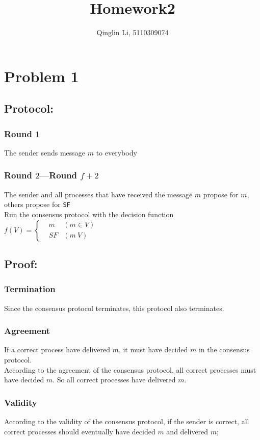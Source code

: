\documentclass[12pt]{article}
\date{}
\title{Homework2}
\author{Qinglin Li, 5110309074}
\begin{document}
\maketitle

\section*{Problem 1}
\subsection*{Protocol:}
\subsubsection*{Round $1$}
The sender sends message $m$ to everybody
\subsubsection*{Round $2$---Round $f+2$}
The sender and all processes that have received the message $m$ propose for $m$, others propose for \texttt{SF}\\
Run the consensus protocol with the decision function
$
	f(V)=\left\{
	\begin{aligned}
		&m  &(m\in V)\\
		&SF &(m\ V)
	\end{aligned}
	\right.
$
\subsection*{Proof:}
\subsubsection*{Termination}
Since the consensus protocol terminates, this protocol also terminates.
\subsubsection*{Agreement}
If a correct process have delivered $m$, it must have decided $m$ in the consensus protocol.\\
According to the agreement of the consensus protocol, all correct processes must have decided $m$. So all correct processes have delivered $m$.
\subsubsection*{Validity}
According to the validity of the consensus protocol, if the sender is correct, all correct processes should eventually have decided $m$ and delivered $m$;
\end{document}

